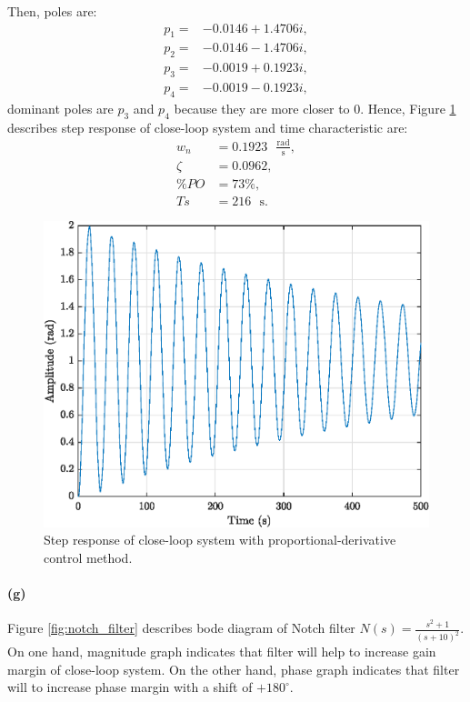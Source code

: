Then, poles are:
\begin{align*}
	p_1=&-0.0146 + 1.4706i, \\
	p_2=&-0.0146 - 1.4706i, \\
	p_3=&-0.0019 + 0.1923i, \\
	p_4=&-0.0019 - 0.1923i ,
\end{align*}
\noindent dominant poles are $p_3$ and $p_4$ because they are more closer to $0$. Hence, Figure \ref{fig:q3_step_KD_CL} describes step response of close-loop system and time characteristic are:
\begin{align*}
	w_n &= 0.1923 \textrm{ } \mathrm{\frac{rad}{s}}, \\
	\zeta &= 0.0962, \\
	\%PO &= 73 \%, \\
	Ts &= 216 \textrm{ } \mathrm{s}. 
\end{align*}

\begin{figure}[h!]
	\centering
	\includegraphics{images/question3/q3_step_KD_CL.eps}
	\caption{Step response of close-loop system with proportional-derivative control method.}
	\label{fig:q3_step_KD_CL}
\end{figure}

\newpage
\paragraph{(g)} Figure \ref{fig:notch_filter} describes bode diagram of Notch filter $N(s)=\frac{s^2 + 1}{(s+10)^2}$. On one hand, magnitude graph indicates that filter will help to increase gain margin of close-loop system. On the other hand, phase graph indicates that filter will to increase phase margin with a shift of $+180^{\circ}$.

